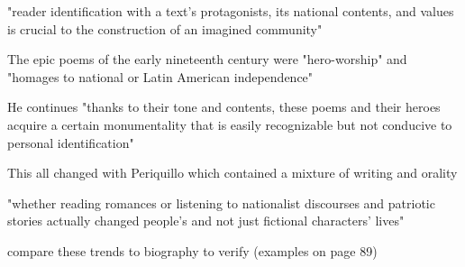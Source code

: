 "reader identification with a text's protagonists, its national contents, and values is crucial to the construction of an imagined community" \cite[82]{Unzueta2002}

The epic poems of the early nineteenth century were "hero-worship" and "homages to national or Latin American independence" \cite[82]{Unzueta2002}

He continues "thanks to their tone and contents, these poems and their heroes acquire a certain monumentality that is easily recognizable but not conducive to personal identification" \cite[82]{Unzueta2002}

This all changed with Periquillo which contained a mixture of writing and orality \cite[82]{Unzueta2002}

"whether reading romances or listening to nationalist discourses and patriotic stories actually changed people's and not just fictional characters' lives" \cite[89]{Unzueta2002}

compare these trends to biography to verify (examples on page 89)




